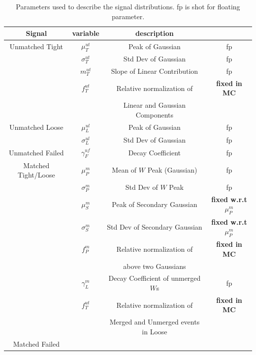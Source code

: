 \begin{table}
\centering
\begin{tabular}{cccc}
Signal & variable & description & \\
\hline
Unmatched Tight &  $\mu^{ut}_T$ & Peak of Gaussian & fp\\
& $\sigma^{ut}_T$ & Std Dev of Gaussian & fp\\
& $m^{ut}_T$ & Slope of Linear Contribution & fp\\
& $f^{ut}_T$ & Relative normalization of & \textbf{fixed in MC}\\
& &  Linear and Gaussian Components &\\
\hline
Unmatched Loose&  $\mu^{ul}_L$ & Peak of Gaussian & fp\\
& $\sigma^{ul}_L$ & Std Dev of Gaussian & fp\\
\hline
Unmatched Failed & $\gamma^{uf}_F$ & Decay Coefficient & fp\\
\hline
Matched Tight/Loose & $\mu^{m}_P$ & Mean of $W$ Peak (Gaussian) & fp\\
& $\sigma^{m}_P$ & Std Dev of $W$ Peak & fp\\
& $\mu^{m}_S$ & Peak of Secondary Gaussian & \textbf{fixed w.r.t $\mu^{m}_P$}\\
& $\sigma^{m}_S$ & Std Dev of Secondary Gaussian & \textbf{fixed w.r.t $\mu^{m}_P$}\\
& $f^{m}_P$ & Relative normalization of & \textbf{fixed in MC}\\
& &  above two Gaussians &\\
& $\gamma^{m}_L$ & Decay Coefficient of unmerged $W$s & fp\\
& $f^{ut}_T$ & Relative normalization of & \textbf{fixed in MC}\\
& &  Merged and Unmerged events in Loose &\\
\hline
Matched Failed & & & \\
\hline
\end{tabular}
\caption{Parameters used to describe the signal distributions. fp is shot for 
floating parameter.} 
\label{tab:sigval}
\end{table}

